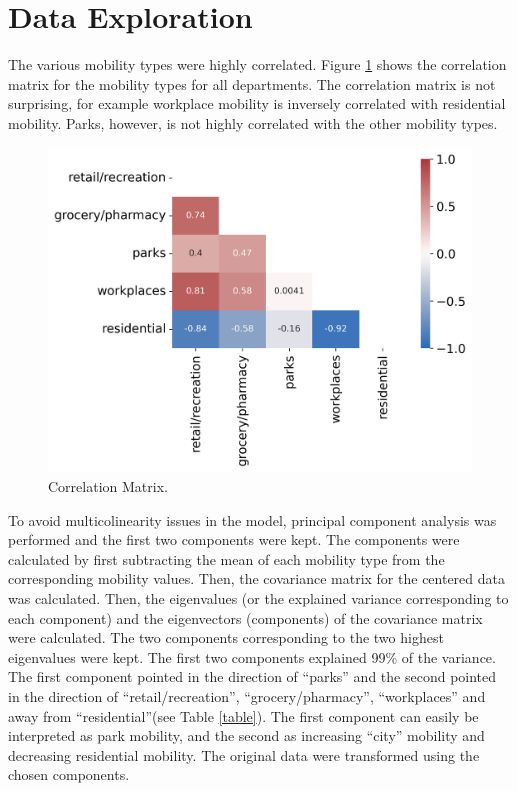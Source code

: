 \documentclass[paper=a4, fontsize=11pt]{scrartcl}
\begin{document}
\section{Data Exploration}
The various mobility types were highly correlated. Figure \ref{corr_mat} shows the correlation matrix for the mobility types for all departments. The correlation matrix is not surprising,  for example workplace mobility is inversely correlated with residential mobility. Parks, however, is not highly correlated with the other mobility types.


\begin{figure}[!htb]
\centering
\includegraphics[width=.7\textwidth]{corr.png}
\caption{Correlation Matrix.}
\label{corr_mat}
\end{figure}

To avoid multicolinearity issues in the model, principal component analysis was performed and the first two components were kept. The components were calculated by first subtracting the mean of each mobility type from the corresponding mobility values. Then, the covariance matrix for the centered data was calculated. Then, the eigenvalues (or the explained variance corresponding to each component) and the eigenvectors (components) of the covariance matrix were calculated. The two components corresponding to the two highest eigenvalues were kept. The first two components explained 99\% of the variance. The first component  pointed in the direction of ``parks'' and the second pointed in the direction of ``retail/recreation'', ``grocery/pharmacy'', ``workplaces'' and away from ``residential''(see Table \ref{table}). The first component can easily be interpreted as park mobility, and the second as increasing ``city'' mobility and decreasing residential mobility. The original data were transformed using the chosen components.\\
\end{document}
